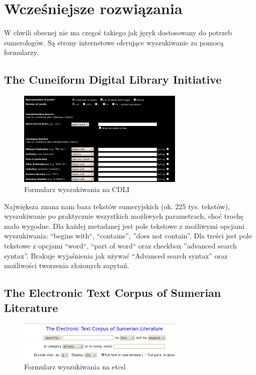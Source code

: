 \chapter{Wcześniejsze rozwiązania}\label{r:losers}
W chwili obecnej nie ma czegoś takiego jak język dostosowany do potrzeb sumerologów. 
Są strony internetowe oferujące wyszukiwanie za pomocą formularzy.
\section{The Cuneiform Digital Library Initiative \cite{cdli}}
\begin{figure}[h]
 \centering
 \includegraphics[width=300px]{../diagramy/cdli-search.png}
 \caption{Formularz wyszukiwania na CDLI}
 \label{fig:cdli-search}
\end{figure}

Największa znana nam baza tekstów sumeryjskich (ok. 225 tys. tekstów), 
wyszukiwanie po praktycznie wszystkich możliwych parametrach, choć trochę mało wygodne. 
Dla każdej metadanej jest pole tekstowe z możliwymi opcjami wyszukiwania: ``begins with``, ``contains'', ''does not contain''. 
Dla treści jest pole tekstowe z opcjami ``word``, ``part of word`` oraz checkbox ''advanced search syntax''. 
Brakuje wyjaśnienia jak 
używać ``Advanced search syntax'' oraz możliwości tworzenia złożonych zapytań.

\section{The Electronic Text Corpus of Sumerian Literature \cite{etcsl}} 
\begin{figure}[h]
 \centering
 \includegraphics[width=300px]{../diagramy/etcsl-search.png}
 \caption{Formularz wyszukiwania na etcsl}
 \label{fig:etcsl-search}
\end{figure}


